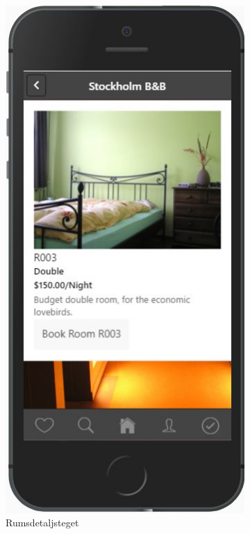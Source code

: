 \documentclass[a4paper]{article}
\begin{document}
\begin{figure}
\begin{subfigure}{.3\textwidth}
  \centering
  \includegraphics[width=.8\linewidth]{room.jpg}
  \caption{Rumsdetaljsteget}
  \label{fig:sfig4}
\end{subfigure}
\begin{subfigure}{.3\textwidth}
  \centering

\end{subfigure}
\end{figure}
\end{document}
